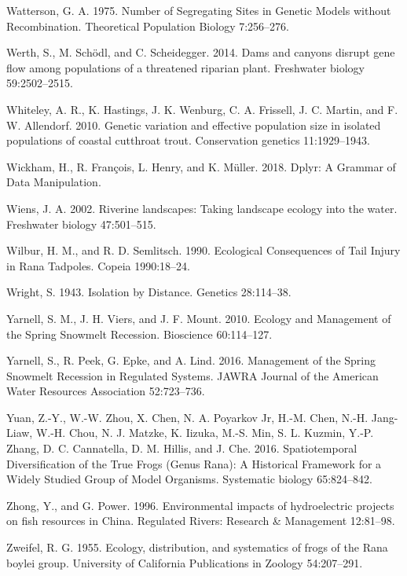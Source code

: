 \documentclass[proquest,12pt,final]{ucthesis-CA2012} %
\begin{document}
\begin{ucmainmatter}
\leavevmode\hypertarget{ref-watterson_number_1975}{}%
Watterson, G. A. 1975. Number of Segregating Sites in Genetic Models
without Recombination. Theoretical Population Biology 7:256--276.

\leavevmode\hypertarget{ref-werth_dams_2014}{}%
Werth, S., M. Schödl, and C. Scheidegger. 2014. Dams and canyons disrupt
gene flow among populations of a threatened riparian plant. Freshwater
biology 59:2502--2515.

\leavevmode\hypertarget{ref-whiteley_genetic_2010}{}%
Whiteley, A. R., K. Hastings, J. K. Wenburg, C. A. Frissell, J. C.
Martin, and F. W. Allendorf. 2010. Genetic variation and effective
population size in isolated populations of coastal cutthroat trout.
Conservation genetics 11:1929--1943.

\leavevmode\hypertarget{ref-wickham_dplyr_2018}{}%
Wickham, H., R. François, L. Henry, and K. Müller. 2018. Dplyr: A
Grammar of Data Manipulation.

\leavevmode\hypertarget{ref-wiens_riverine_2002}{}%
Wiens, J. A. 2002. Riverine landscapes: Taking landscape ecology into
the water. Freshwater biology 47:501--515.

\leavevmode\hypertarget{ref-wilbur_ecological_1990}{}%
Wilbur, H. M., and R. D. Semlitsch. 1990. Ecological Consequences of
Tail Injury in Rana Tadpoles. Copeia 1990:18--24.

\leavevmode\hypertarget{ref-wright_isolation_1943}{}%
Wright, S. 1943. Isolation by Distance. Genetics 28:114--38.

\leavevmode\hypertarget{ref-yarnell_ecology_2010}{}%
Yarnell, S. M., J. H. Viers, and J. F. Mount. 2010. Ecology and
Management of the Spring Snowmelt Recession. Bioscience 60:114--127.

\leavevmode\hypertarget{ref-yarnell_management_2016}{}%
Yarnell, S., R. Peek, G. Epke, and A. Lind. 2016. Management of the
Spring Snowmelt Recession in Regulated Systems. JAWRA Journal of the
American Water Resources Association 52:723--736.

\leavevmode\hypertarget{ref-yuan_spatiotemporal_2016}{}%
Yuan, Z.-Y., W.-W. Zhou, X. Chen, N. A. Poyarkov Jr, H.-M. Chen, N.-H.
Jang-Liaw, W.-H. Chou, N. J. Matzke, K. Iizuka, M.-S. Min, S. L. Kuzmin,
Y.-P. Zhang, D. C. Cannatella, D. M. Hillis, and J. Che. 2016.
Spatiotemporal Diversification of the True Frogs (Genus Rana): A
Historical Framework for a Widely Studied Group of Model Organisms.
Systematic biology 65:824--842.

\leavevmode\hypertarget{ref-zhong_environmental_1996}{}%
Zhong, Y., and G. Power. 1996. Environmental impacts of hydroelectric
projects on fish resources in China. Regulated Rivers: Research \&
Management 12:81--98.

\leavevmode\hypertarget{ref-zweifel_ecology_1955}{}%
Zweifel, R. G. 1955. Ecology, distribution, and systematics of frogs of
the Rana boylei group. University of California Publications in Zoology
54:207--291.

\end{ucmainmatter}
\end{document}
